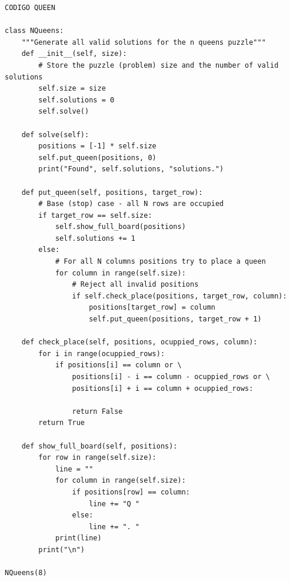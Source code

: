\documentclass[runningheads,a4paper]{llncs}
\begin{document}
\begin{lstlisting}
CODIGO QUEEN

class NQueens:
    """Generate all valid solutions for the n queens puzzle"""
    def __init__(self, size):
        # Store the puzzle (problem) size and the number of valid solutions
        self.size = size
        self.solutions = 0
        self.solve()

    def solve(self):
        positions = [-1] * self.size
        self.put_queen(positions, 0)
        print("Found", self.solutions, "solutions.")

    def put_queen(self, positions, target_row):
        # Base (stop) case - all N rows are occupied
        if target_row == self.size:
            self.show_full_board(positions)
            self.solutions += 1
        else:
            # For all N columns positions try to place a queen
            for column in range(self.size):
                # Reject all invalid positions
                if self.check_place(positions, target_row, column):
                    positions[target_row] = column
                    self.put_queen(positions, target_row + 1)

    def check_place(self, positions, ocuppied_rows, column):
        for i in range(ocuppied_rows):
            if positions[i] == column or \
                positions[i] - i == column - ocuppied_rows or \
                positions[i] + i == column + ocuppied_rows:

                return False
        return True

    def show_full_board(self, positions):
        for row in range(self.size):
            line = ""
            for column in range(self.size):
                if positions[row] == column:
                    line += "Q "
                else:
                    line += ". "
            print(line)
        print("\n")

NQueens(8)
\end{lstlisting}
\end{document}
